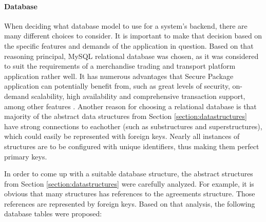 \paragraph{Database}
When deciding what database model to use for a system's backend, there are many different choices to consider. It is important to make that decision based on the specific features and demands of the application in question. Based on that reasoning principal, MySQL relational database was chosen, as it was considered to suit the requirements of a merchandise trading and transport platform application rather well. It has numerous advantages that Secure Package application can potentially benefit from, such as great levels of security, on-demand scalability, high availability and comprehensive transaction support, among other features \citep{mysqladvantages}. Another reason for choosing a relational database is that majority of the abstract data structures from Section \ref{section:datastructures} have strong connections to eachother (such as substructures and superstructures), which could easily be represented with foreign keys. Nearly all instances of structures are to be configured with unique identifiers, thus making them perfect primary keys.

In order to come up with a suitable database structure, the abstract structures from Section \ref{section:datastructures} were carefully analyzed. For example, it is obvious that many structures has references to the agreements structure. Those references are represented by foreign keys. Based on that analysis, the following database tables were proposed:

